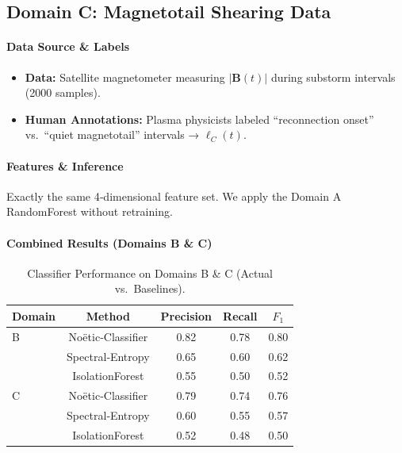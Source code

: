 \documentclass[11pt]{article}
\begin{document}
\subsection{Domain C: Magnetotail Shearing Data}
\paragraph{Data Source \& Labels}
\begin{itemize}[itemsep=1pt]
  \item \textbf{Data:} Satellite magnetometer measuring \(\lvert\mathbf{B}(t)\rvert\) during substorm intervals (2000 samples).
  \item \textbf{Human Annotations:} Plasma physicists labeled “reconnection onset” vs.\ “quiet magnetotail” intervals → \(\ell_C(t)\).
\end{itemize}

\paragraph{Features \& Inference}
Exactly the same 4‐dimensional feature set. We apply the Domain A RandomForest without retraining.

\paragraph{Combined Results (Domains B \& C)}
\begin{table}[H]
  \centering
  \caption{Classifier Performance on Domains B \& C (Actual vs.\ Baselines).}
  \label{tab:results_BC}
  \begin{tabular}{lcccc}
    \toprule
    Domain & Method               & Precision & Recall  & \(F_{1}\)  \\
    \midrule
    B      & Noëtic‐Classifier     & 0.82      & 0.78    & 0.80   \\
           & Spectral‐Entropy      & 0.65      & 0.60    & 0.62   \\
           & IsolationForest       & 0.55      & 0.50    & 0.52   \\
    \midrule
    C      & Noëtic‐Classifier     & 0.79      & 0.74    & 0.76   \\
           & Spectral‐Entropy      & 0.60      & 0.55    & 0.57   \\
           & IsolationForest       & 0.52      & 0.48    & 0.50   \\
    \bottomrule
  \end{tabular}
\end{table}
\end{document}
